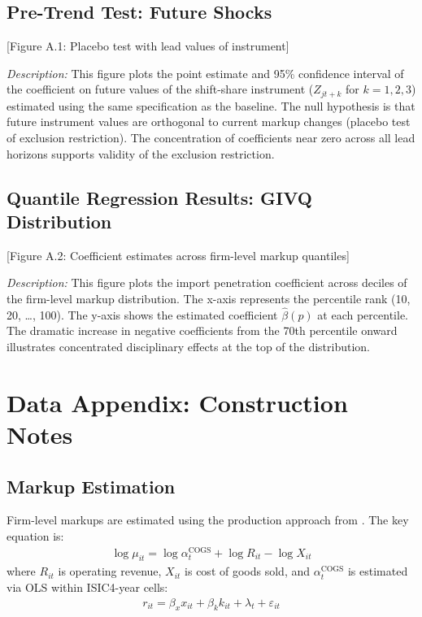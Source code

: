 \documentclass[12pt]{article}
\begin{document}
\subsection{Pre-Trend Test: Future Shocks}

[Figure A.1: Placebo test with lead values of instrument]

\textit{Description:} This figure plots the point estimate and 95\% confidence interval of the coefficient on future values of the shift-share instrument ($Z_{jt+k}$ for $k = 1, 2, 3$) estimated using the same specification as the baseline. The null hypothesis is that future instrument values are orthogonal to current markup changes (placebo test of exclusion restriction). The concentration of coefficients near zero across all lead horizons supports validity of the exclusion restriction.

\subsection{Quantile Regression Results: GIVQ Distribution}

[Figure A.2: Coefficient estimates across firm-level markup quantiles]

\textit{Description:} This figure plots the import penetration coefficient across deciles of the firm-level markup distribution. The x-axis represents the percentile rank (10, 20, \ldots, 100). The y-axis shows the estimated coefficient $\hat{\beta}(p)$ at each percentile. The dramatic increase in negative coefficients from the 70th percentile onward illustrates concentrated disciplinary effects at the top of the distribution.

\section{Data Appendix: Construction Notes}

\subsection{Markup Estimation}

Firm-level markups are estimated using the production approach from \cite{deridderHitchhikersGuideMarkup2026}. The key equation is:
\begin{align}
\log \mu_{it} = \log \alpha_t^{\text{COGS}} + \log R_{it} - \log X_{it}
\end{align}
where $R_{it}$ is operating revenue, $X_{it}$ is cost of goods sold, and $\alpha_t^{\text{COGS}}$ is estimated via OLS within ISIC4-year cells:
\begin{align}
r_{it} = \beta_x x_{it} + \beta_k k_{it} + \lambda_t + \varepsilon_{it}
\end{align}
\end{document}
